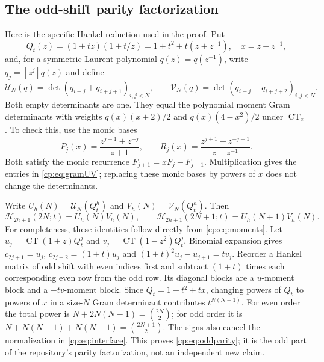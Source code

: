 \documentclass[11pt]{article}
\theoremstyle{definition}
\theoremstyle{remark}
\newcommand{\CT}{\operatorname{CT}}
\newcommand{\Ht}{\mathcal H}
\theoremstyle{definition}
\theoremstyle{plain}
\numberwithin{equation}{section}
\begin{document}
\subsection{The odd-shift parity factorization}
Here is the specific Hankel reduction used in the proof. Put
\[
 Q_t(z)=(1+tz)(1+t/z)=1+t^2+t(z+z^{-1}),\quad x=z+z^{-1},
\]
and, for a symmetric Laurent polynomial $q(z)=q(z^{-1})$, write
$q_j=[z^j]q(z)$ and define
\begin{equation}
 \mathcal U_N(q)=\det(q_{i-j}+q_{i+j+1})_{i,j<N},\qquad
 \mathcal V_N(q)=\det(q_{i-j}-q_{i+j+2})_{i,j<N}.
 \label{cp:eq:gramUV}
\end{equation}
Both empty determinants are one. They equal the polynomial moment
Gram determinants with weights $q(x)(x+2)/2$ and $q(x)(4-x^2)/2$ under
$\CT_z$. To check this, use the monic bases
\[
 P_j(x)=\frac{z^{j+1}+z^{-j}}{z+1},\qquad
 R_j(x)=\frac{z^{j+1}-z^{-j-1}}{z-z^{-1}}.
\]
Both satisfy the monic recurrence $F_{j+1}=xF_j-F_{j-1}$.
Multiplication gives the entries in \eqref{cp:eq:gramUV}; replacing these
monic bases by powers of $x$ does not change the determinants.

Write $U_h(N)=\mathcal U_N(Q_t^h)$ and
$V_h(N)=\mathcal V_N(Q_t^h)$. Then
\begin{equation}
 \Ht_{2h+1}(2N;t)=U_h(N)V_h(N),\qquad
 \Ht_{2h+1}(2N+1;t)=U_h(N+1)V_h(N).
 \label{cp:eq:oddparity}
\end{equation}
For completeness, these identities follow directly from
\eqref{cp:eq:moments}. Let
$u_j=\CT(1+z)Q_t^j$ and $v_j=\CT(1-z^2)Q_t^j$.
Binomial expansion gives $c_{2j+1}=u_j$, $c_{2j+2}=(1+t)u_j$ and
$(1+t)^2u_j-u_{j+1}=t v_j$. Reorder a Hankel matrix of odd shift with
even indices first and subtract $(1+t)$ times each corresponding even row
from the odd row. Its diagonal blocks are a $u$-moment block and a
$-t v$-moment block. Since $Q_t=1+t^2+tx$, changing powers of $Q_t$
to powers of $x$ in a size-$N$ Gram determinant contributes
$t^{N(N-1)}$. For even order the total power is
$N+2N(N-1)=\binom{2N}{2}$; for odd order it is
$N+N(N+1)+N(N-1)=\binom{2N+1}{2}$.
The signs also cancel the normalization in \eqref{cp:eq:interface}.
This proves \eqref{cp:eq:oddparity}; it is the odd part of the repository's
parity factorization, not an independent new claim.
\end{document}
